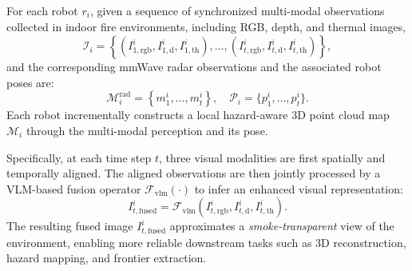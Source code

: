 For each robot $r_i$, given a sequence of synchronized multi-modal observations collected in indoor fire environments,
including RGB, depth, and thermal images,
\begin{equation}
\mathcal{I}_i =
\left\{
\left(I^{i}_{1,\mathrm{rgb}}, I^{i}_{1,\mathrm{d}}, I^{i}_{1,\mathrm{th}}\right), \dots,
\left(I^{i}_{t,\mathrm{rgb}}, I^{i}_{t,\mathrm{d}}, I^{i}_{t,\mathrm{th}}\right)
\right\},
\end{equation}
and the corresponding mmWave radar observations and the associated robot poses are:
\begin{equation}
\mathcal{M}_i^{\mathrm{rad}} =
\left\{
m_1^i, \dots, m_t^i
\right\}, \quad
\mathcal{P}_i = \{p^i_1, \dots, p^i_t\}.
\end{equation}
Each robot incrementally constructs a local hazard-aware 3D point cloud map $\mathcal{M}_i$ through the multi-modal perception and its pose.

Specifically, at each time step $t$, three visual modalities are first spatially and temporally aligned.
The aligned observations are then jointly processed by a VLM-based fusion operator $\mathcal{F}_{\mathrm{vlm}}(\cdot)$ to infer an enhanced visual representation:
\begin{equation}
I^{i}_{t,\mathrm{fused}} =
\mathcal{F}_{\mathrm{vlm}}
\left(
I^{i}_{t,\mathrm{rgb}},
I^{i}_{t,\mathrm{d}},
I^{i}_{t,\mathrm{th}}
\right).
\end{equation}
The resulting fused image $I^{i}_{t,\mathrm{fused}}$ approximates a \emph{smoke-transparent} view of the environment, enabling more reliable downstream tasks such as 3D reconstruction, hazard mapping, and frontier extraction.

